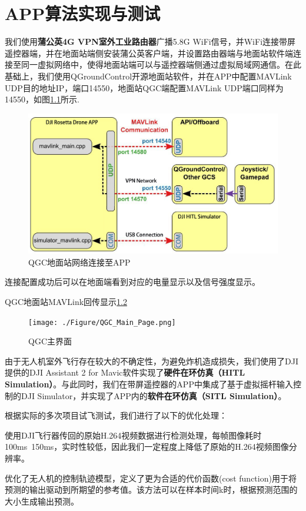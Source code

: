 \chapter{APP算法实现与测试}

我们使用\textbf{蒲公英4G VPN室外工业路由器}广播5.8G WiFi信号，并WiFi连接带屏遥控器端，并在地面站端侧安装蒲公英客户端，并设置路由器端与地面站软件端连接至同一虚拟网络中，使得地面站端可以与遥控器端侧通过虚拟局域网通信。在此基础上，我们使用QGroundControl开源地面站软件，并在APP中配置MAVLink UDP目的地址IP，端口14550，地面站QGC端配置MAVLink UDP端口同样为14550，如图\ref{Fig:img13}所示.

\begin{figure}[ht]
  \centering
  \includegraphics[width=0.8\linewidth]{./Figure/QGC_Connect_to_APP.png}
  \caption{QGC地面站网络连接至APP}\label{Fig:img13}
\end{figure}

连接配置成功后可以在地面端看到对应的电量显示以及信号强度显示。

QGC地面站MAVLink回传显示\ref{Fig:img15}

\begin{figure}[ht]
  \centering
  \texttt{[image: ./Figure/QGC\_Main\_Page.png]}
  \caption{QGC主界面}\label{Fig:img15}
\end{figure}

由于无人机室外飞行存在较大的不确定性，为避免炸机造成损失，我们使用了DJI提供的DJI Assistant 2 for Mavic软件实现了\textbf{硬件在环仿真（HITL Simulation）}。与此同时，我们在带屏遥控器的APP中集成了基于虚拟摇杆输入控制的DJI Simulator，并实现了APP内的\textbf{软件在环仿真（SITL Simulation）}。

根据实际的多次项目试飞测试，我们进行了以下的优化处理：

使用DJI飞行器传回的原始H.264视频数据进行检测处理，每帧图像耗时100ms~150ms，实时性较低，因此我们一定程度上降低了原始的H.264视频图像分辨率。

优化了无人机的控制轨迹模型，定义了更为合适的代价函数(cost function)用于将预测的输出驱动到所期望的参考值。该方法可以在样本时间k时，根据预测范围的大小生成输出预测。

